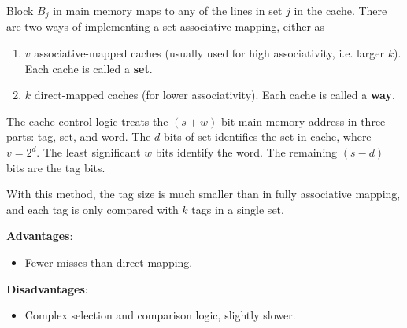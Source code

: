 \begin{enumerate}
    Block $B_j$ in main memory maps to any of the lines in set $j$ in the cache. There are
    two ways of implementing a set associative mapping, either as
    \begin{enumerate}
        \item $v$ associative-mapped caches 
            (usually used for high associativity, i.e. larger $k$).
            Each cache is called a \textbf{set}.
        \item $k$ direct-mapped caches (for lower associativity).
            Each cache is called a \textbf{way}.
    \end{enumerate}

    The cache control logic treats the $(s+w)$-bit main memory address in three parts:
    tag, set, and word.
    The $d$ bits of set identifies the set in cache, where $v = 2^d$.
    The least significant $w$ bits identify the word.
    The remaining $(s-d)$ bits are the tag bits.

    With this method, the tag size is much smaller than in fully associative mapping,
    and each tag is only compared with $k$ tags in a single set.

    \begin{multicols}{2}
        \textbf{Advantages}: \begin{itemize}
            \item Fewer misses than direct mapping.
        \end{itemize}
        \columnbreak
        \textbf{Disadvantages}: \begin{itemize}
            \item Complex selection and comparison logic, slightly slower.
        \end{itemize}
    \end{multicols}

\end{enumerate}

